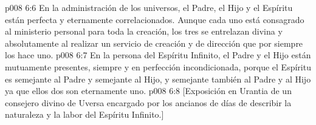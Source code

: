 \vs p008 6:6 \pc En la administración de los universos, el Padre, el Hijo y el Espíritu están perfecta y eternamente correlacionados. Aunque cada uno está consagrado al ministerio personal para toda la creación, los tres se entrelazan divina y absolutamente al realizar un servicio de creación y de dirección que por siempre los hace uno.
\vs p008 6:7 En la persona del Espíritu Infinito, el Padre y el Hijo están mutuamente presentes, siempre y en perfección incondicionada, porque el Espíritu es semejante al Padre y semejante al Hijo, y semejante también al Padre y al Hijo ya que ellos dos son eternamente uno.
\vsetoff
\vs p008 6:8 [Exposición en Urantia de un consejero divino de Uversa encargado por los ancianos de días de describir la naturaleza y la labor del Espíritu Infinito.]
